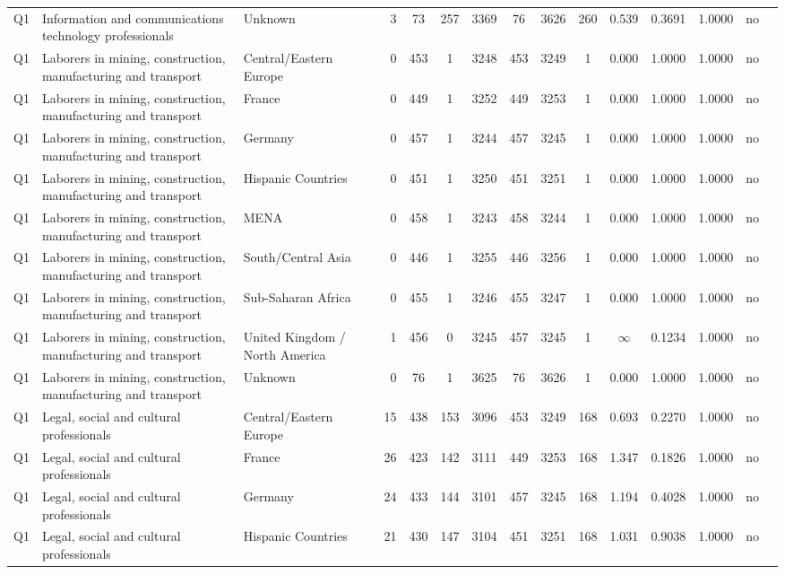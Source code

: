 \begin{longtable}{lllrcccccccccll}
Q1 & Information and communications technology professionals & Unknown & 3 & 73 & 257 & 3369 & 76 & 3626 & 260 & 0.539 & 0.3691 & 1.0000 & no \\
Q1 & Laborers in mining, construction, manufacturing and transport & Central/Eastern Europe & 0 & 453 & 1 & 3248 & 453 & 3249 & 1 & 0.000 & 1.0000 & 1.0000 & no \\
Q1 & Laborers in mining, construction, manufacturing and transport & France & 0 & 449 & 1 & 3252 & 449 & 3253 & 1 & 0.000 & 1.0000 & 1.0000 & no \\
Q1 & Laborers in mining, construction, manufacturing and transport & Germany & 0 & 457 & 1 & 3244 & 457 & 3245 & 1 & 0.000 & 1.0000 & 1.0000 & no \\
Q1 & Laborers in mining, construction, manufacturing and transport & Hispanic Countries & 0 & 451 & 1 & 3250 & 451 & 3251 & 1 & 0.000 & 1.0000 & 1.0000 & no \\
Q1 & Laborers in mining, construction, manufacturing and transport & MENA & 0 & 458 & 1 & 3243 & 458 & 3244 & 1 & 0.000 & 1.0000 & 1.0000 & no \\
Q1 & Laborers in mining, construction, manufacturing and transport & South/Central Asia & 0 & 446 & 1 & 3255 & 446 & 3256 & 1 & 0.000 & 1.0000 & 1.0000 & no \\
Q1 & Laborers in mining, construction, manufacturing and transport & Sub-Saharan Africa & 0 & 455 & 1 & 3246 & 455 & 3247 & 1 & 0.000 & 1.0000 & 1.0000 & no \\
Q1 & Laborers in mining, construction, manufacturing and transport & United Kingdom / North America & 1 & 456 & 0 & 3245 & 457 & 3245 & 1 & $\infty$ & 0.1234 & 1.0000 & no \\
Q1 & Laborers in mining, construction, manufacturing and transport & Unknown & 0 & 76 & 1 & 3625 & 76 & 3626 & 1 & 0.000 & 1.0000 & 1.0000 & no \\
Q1 & Legal, social and cultural professionals & Central/Eastern Europe & 15 & 438 & 153 & 3096 & 453 & 3249 & 168 & 0.693 & 0.2270 & 1.0000 & no \\
Q1 & Legal, social and cultural professionals & France & 26 & 423 & 142 & 3111 & 449 & 3253 & 168 & 1.347 & 0.1826 & 1.0000 & no \\
Q1 & Legal, social and cultural professionals & Germany & 24 & 433 & 144 & 3101 & 457 & 3245 & 168 & 1.194 & 0.4028 & 1.0000 & no \\
Q1 & Legal, social and cultural professionals & Hispanic Countries & 21 & 430 & 147 & 3104 & 451 & 3251 & 168 & 1.031 & 0.9038 & 1.0000 & no \\

\end{longtable}
